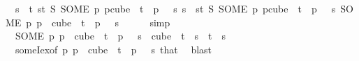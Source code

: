 \begin{isabellebody}
\ {}{\isacharcolon}{\kern0pt}\ {\isachardoublequoteopen}{\isasymforall}s\ {\isasymin}\ {\isacharbraceleft}{\kern0pt}{\isachardot}{\kern0pt}{\isachardot}{\kern0pt}{\isacharless}{\kern0pt}t{\isacharbraceright}{\kern0pt}{\isachardot}{\kern0pt}\ {\isacharparenleft}{\kern0pt}{\isasymlambda}s{\isasymin}{\isacharbraceleft}{\kern0pt}{\isachardot}{\kern0pt}{\isachardot}{\kern0pt}{\isacharless}{\kern0pt}t{\isacharbraceright}{\kern0pt}{\isachardot}{\kern0pt}\ S\ {\isacharparenleft}{\kern0pt}SOME\ p{\isachardot}{\kern0pt}\ p{\isasymin}cube\ {}\ t\ {\isasymand}\ p\ {}\ {\isacharequal}{\kern0pt}\ s{\isacharparenright}{\kern0pt}{\isacharparenright}{\kern0pt}\ s\ {\isacharequal}{\kern0pt}\ {\isacharparenleft}{\kern0pt}{\isasymlambda}s{\isasymin}{\isacharbraceleft}{\kern0pt}{\isachardot}{\kern0pt}{\isachardot}{\kern0pt}{\isacharless}{\kern0pt}t{\isacharbraceright}{\kern0pt}{\isachardot}{\kern0pt}\ S\ {\isacharparenleft}{\kern0pt}SOME\ p{\isachardot}{\kern0pt}\ p{\isasymin}cube\ {}\ t\ {\isasymand}\ p\ {}\ {\isacharequal}{\kern0pt}\ s{\isacharparenright}{\kern0pt}{\isacharparenright}{\kern0pt}\ {\isacharparenleft}{\kern0pt}{\isacharparenleft}{\kern0pt}SOME\ p{\isachardot}{\kern0pt}\ p\ {\isasymin}\ cube\ {}\ t\ {\isasymand}\ p\ {}\ {\isacharequal}{\kern0pt}\ s{\isacharparenright}{\kern0pt}\ {}{\isacharparenright}{\kern0pt}{\isachardoublequoteclose}\ \isamarkupfalse%
\ {}\ \isamarkupfalse%
\ simp\isanewline
\ \ \isamarkupfalse%
\ {}{\isacharcolon}{\kern0pt}\ {\isachardoublequoteopen}{\isacharparenleft}{\kern0pt}SOME\ p{\isachardot}{\kern0pt}\ p\ {\isasymin}\ cube\ {}\ t\ {\isasymand}\ p\ {}\ {\isacharequal}{\kern0pt}\ s{\isacharparenright}{\kern0pt}\ {\isasymin}\ cube\ {}\ t{\isachardoublequoteclose}\ \ {\isachardoublequoteopen}s\ {\isasymin}\ {\isacharbraceleft}{\kern0pt}{\isachardot}{\kern0pt}{\isachardot}{\kern0pt}{\isacharless}{\kern0pt}t{\isacharbraceright}{\kern0pt}{\isachardoublequoteclose}\ \ s\ \isamarkupfalse%
\ {}\ someI{\isacharunderscore}{\kern0pt}ex{\isacharbrackleft}{\kern0pt}of\ {\isachardoublequoteopen}{\isasymlambda}p{\isachardot}{\kern0pt}\ p\ {\isasymin}\ cube\ {}\ t\ {\isasymand}\ p\ {}\ {\isacharequal}{\kern0pt}\ s{\isachardoublequoteclose}{\isacharbrackright}{\kern0pt}\ that\ \isamarkupfalse%
\ blast\isanewline
\ \ \isamarkupfalse%
\ \isamarkupfalse%

\end{isabellebody}

